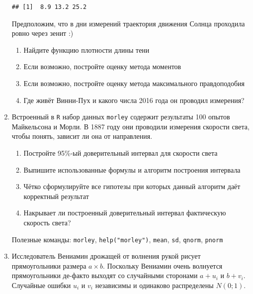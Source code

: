 \documentclass[12pt, a4paper]{article}\usepackage[]{graphicx}\usepackage[]{color}
\makeatletter
\newenvironment{kframe}{%
 \def\at@end@of@kframe{}%
 \ifinner\ifhmode%
  \def\at@end@of@kframe{\end{minipage}}%
  \begin{minipage}{\columnwidth}%
 \fi\fi%
 \def\FrameCommand##1{\hskip\@totalleftmargin \hskip-\fboxsep
 \colorbox{shadecolor}{##1}\hskip-\fboxsep
     \hskip-\linewidth \hskip-\@totalleftmargin \hskip\columnwidth}%
 \MakeFramed {\advance\hsize-\width
   \@totalleftmargin\z@ \linewidth\hsize
   \@setminipage}}%
 {\par\unskip\endMakeFramed%
 \at@end@of@kframe}
\newenvironment{knitrout}{}{} %
\makeatother
\begin{document}
\begin{enumerate}
\begin{knitrout}
\color{fgcolor}\begin{kframe}
\begin{verbatim}
## [1]  8.9 13.2 25.2
\end{verbatim}
\end{kframe}
\end{knitrout}

Предположим, что в дни измерений траектория движения Солнца проходила ровно через зенит :)

\begin{enumerate}
\item Найдите функцию плотности длины тени
\item Если возможно, постройте оценку метода моментов
\item Если возможно, постройте оценку метода максимального правдоподобия
\item Где живёт Винни-Пух и какого числа 2016 года он проводил измерения?
\end{enumerate}

\item Встроенный в \verb|R| набор данных \verb|morley| содержит результаты 100 опытов Майкельсона и Морли. В 1887 году они проводили измерения скорости света, чтобы понять, зависит ли она от направления.

\begin{enumerate}
\item Постройте 95\%-ый доверительный интервал для скорости света
\item Выпишите использованные формулы и алгоритм построения интервала
\item Чётко сформулируйте все гипотезы при которых данный алгоритм даёт корректный результат
\item Накрывает ли построенный доверительный интервал фактическую скорость света?
\end{enumerate}

Полезные команды: \verb|morley|, \verb|help("morley")|, \verb|mean|, \verb|sd|, \verb|qnorm|, \verb|pnorm|



\item  Исследователь Вениамин дрожащей от волнения рукой рисует прямоугольники размера $a\times b$. Поскольку Вениамин очень волнуется прямоугольники де-факто выходят со случайными сторонами $a+u_i$ и $b+v_i$. Случайные ошибки $u_i$ и $v_i$ независимы и одинаково распределены $N(0;1)$.





\end{enumerate}
\end{document}
